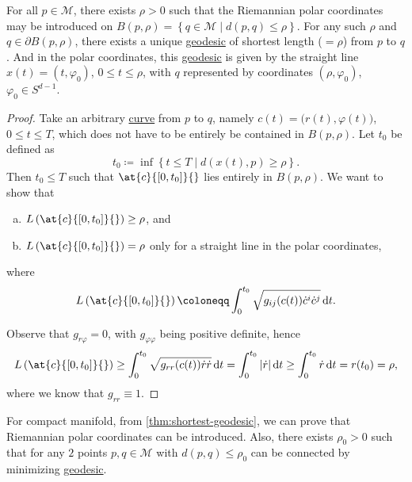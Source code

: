 \begin{theorem}\label{thm:shortest-geodesic}
	For all \(p\in \mathcal{M} \), there exists \(\rho > 0\) such that the Riemannian polar coordinates may be introduced on \(B(p, \rho ) = \left\{ q\in \mathcal{M} \mid d(p, q) \leq \rho \right\} \). For any such \(\rho \) and \(q\in \partial B(p, \rho )\), there exists a unique \hyperref[def:geodesic]{geodesic} of shortest length (\(=\rho \)) from \(p\) to \(q\). And in the polar coordinates, this \hyperref[def:geodesic]{geodesic} is given by the straight line \(x(t) = (t, \varphi _0)\), \(0 \leq t \leq \rho \), with \(q\) represented by coordinates \((\rho , \varphi _0)\), \(\varphi _0\in S^{d-1}\).
\end{theorem}
\begin{proof}
	Take an arbitrary \hyperref[def:curve]{curve} from \(p\) to \(q\), namely \(c(t) = \big(r(t), \varphi (t)\big)\), \(0 \leq t \leq T\), which does not have to be entirely be contained in \(B(p, \rho )\). Let \(t_0\) be defined as
	\[
		t_0 \coloneqq \inf \left\{ t \leq T \mid d(x(t), p) \geq \rho \right\}.
	\]
	Then \(t_0 \leq T\) such that \(\at{c}{[0, t_0]}{} \) lies entirely in \(B(p, \rho )\). We want to show that
	\begin{enumerate}[(a)]
		\item \(L\left( \at{c}{[0, t_0]}{} \right) \geq \rho \), and
		\item \(L\left( \at{c}{[0, t_0]}{} \right) = \rho \) only for a straight line in the polar coordinates,
	\end{enumerate}
	where
	\[
		L\left( \at{c}{[0 ,t_0]}{} \right) \coloneqq \int_{0}^{t_0} \sqrt{g_{ij}(c(t)) \dot{c}^i \dot{c}^j} \,\mathrm{d}t.
	\]

	Observe that \(g_{r \varphi } = 0\), with \(g_{\varphi \varphi }\) being positive definite, hence
	\[
		L\left( \at{c}{[0, t_0]}{} \right)
		\geq \int_{0}^{t_0} \sqrt{g_{r r}(c(t)) \dot{r} \dot{r}} \,\mathrm{d}t
		= \int_{0}^{t_0} \vert \dot{r} \vert \,\mathrm{d}t
		\geq \int_{0}^{t_0} \dot{r} \,\mathrm{d}t
		= r(t_0)
		= \rho,
	\]
	where we know that \(g_{r r} \equiv 1\).
\end{proof}

\begin{remark}
	For compact manifold, from \autoref{thm:shortest-geodesic}, we can prove that Riemannian polar coordinates can be introduced. Also, there exists \(\rho _0 > 0\) such that for any \(2\) points \(p, q\in \mathcal{M} \) with \(d(p, q) \leq \rho _0\) can be connected by minimizing \hyperref[def:geodesic]{geodesic}.
\end{remark}